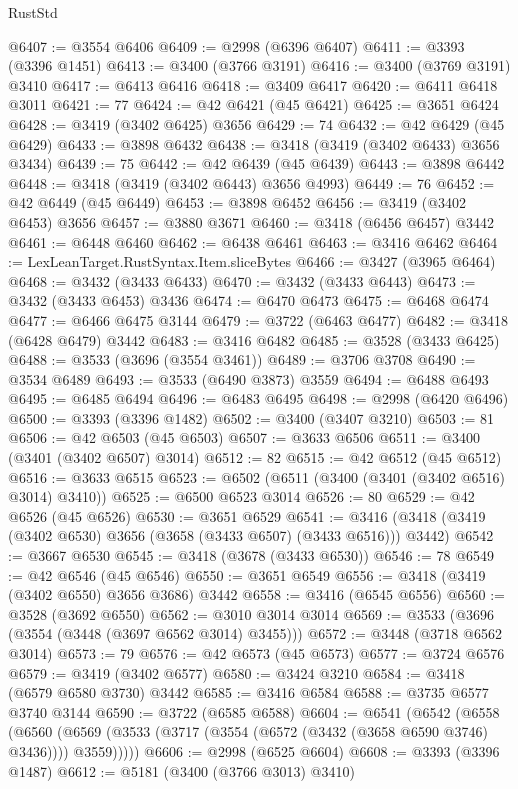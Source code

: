\begin{lexlean}{RustStd}
\begin{coremodule}
@6407 := @3554 @6406
@6409 := @2998 (@6396 @6407)
@6411 := @3393 (@3396 @1451)
@6413 := @3400 (@3766 @3191)
@6416 := @3400 (@3769 @3191) @3410
@6417 := @6413 @6416
@6418 := @3409 @6417
@6420 := @6411 @6418 @3011
@6421 := 77
@6424 := @42 @6421 (@45 @6421)
@6425 := @3651 @6424
@6428 := @3419 (@3402 @6425) @3656
@6429 := 74
@6432 := @42 @6429 (@45 @6429)
@6433 := @3898 @6432
@6438 := @3418 (@3419 (@3402 @6433) @3656 @3434)
@6439 := 75
@6442 := @42 @6439 (@45 @6439)
@6443 := @3898 @6442
@6448 := @3418 (@3419 (@3402 @6443) @3656 @4993)
@6449 := 76
@6452 := @42 @6449 (@45 @6449)
@6453 := @3898 @6452
@6456 := @3419 (@3402 @6453) @3656
@6457 := @3880 @3671
@6460 := @3418 (@6456 @6457) @3442
@6461 := @6448 @6460
@6462 := @6438 @6461
@6463 := @3416 @6462
@6464 := LexLeanTarget.RustSyntax.Item.sliceBytes
@6466 := @3427 (@3965 @6464)
@6468 := @3432 (@3433 @6433)
@6470 := @3432 (@3433 @6443)
@6473 := @3432 (@3433 @6453) @3436
@6474 := @6470 @6473
@6475 := @6468 @6474
@6477 := @6466 @6475 @3144
@6479 := @3722 (@6463 @6477)
@6482 := @3418 (@6428 @6479) @3442
@6483 := @3416 @6482
@6485 := @3528 (@3433 @6425)
@6488 := @3533 (@3696 (@3554 @3461))
@6489 := @3706 @3708
@6490 := @3534 @6489
@6493 := @3533 (@6490 @3873) @3559
@6494 := @6488 @6493
@6495 := @6485 @6494
@6496 := @6483 @6495
@6498 := @2998 (@6420 @6496)
@6500 := @3393 (@3396 @1482)
@6502 := @3400 (@3407 @3210)
@6503 := 81
@6506 := @42 @6503 (@45 @6503)
@6507 := @3633 @6506
@6511 := @3400 (@3401 (@3402 @6507) @3014)
@6512 := 82
@6515 := @42 @6512 (@45 @6512)
@6516 := @3633 @6515
@6523 := @6502 (@6511 (@3400 (@3401 (@3402 @6516) @3014) @3410))
@6525 := @6500 @6523 @3014
@6526 := 80
@6529 := @42 @6526 (@45 @6526)
@6530 := @3651 @6529
@6541 := @3416 (@3418 (@3419 (@3402 @6530) @3656 (@3658 (@3433 @6507) (@3433 @6516))) @3442)
@6542 := @3667 @6530
@6545 := @3418 (@3678 (@3433 @6530))
@6546 := 78
@6549 := @42 @6546 (@45 @6546)
@6550 := @3651 @6549
@6556 := @3418 (@3419 (@3402 @6550) @3656 @3686) @3442
@6558 := @3416 (@6545 @6556)
@6560 := @3528 (@3692 @6550)
@6562 := @3010 @3014 @3014
@6569 := @3533 (@3696 (@3554 (@3448 (@3697 @6562 @3014) @3455)))
@6572 := @3448 (@3718 @6562 @3014)
@6573 := 79
@6576 := @42 @6573 (@45 @6573)
@6577 := @3724 @6576
@6579 := @3419 (@3402 @6577)
@6580 := @3424 @3210
@6584 := @3418 (@6579 @6580 @3730) @3442
@6585 := @3416 @6584
@6588 := @3735 @6577 @3740 @3144
@6590 := @3722 (@6585 @6588)
@6604 := @6541
    (@6542
      (@6558
        (@6560 (@6569 (@3533 (@3717 (@3554 (@6572 (@3432 (@3658 @6590 @3746) @3436)))) @3559)))))
@6606 := @2998 (@6525 @6604)
@6608 := @3393 (@3396 @1487)
@6612 := @5181 (@3400 (@3766 @3013) @3410)

\end{coremodule}
\end{lexlean}
